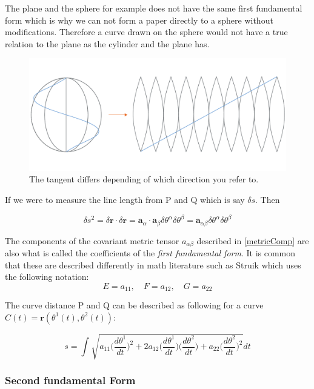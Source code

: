 The plane and the sphere for example does not have the same first fundamental form which is why we can not form a paper directly to a sphere without modifications. Therefore a curve drawn on the sphere would not have a true relation to the plane as the cylinder and the plane has.

\begin{figure}[H]
\centering
\includegraphics[width=0.9\linewidth ]{figure/Theory/unrollSurfMod.pdf}
\caption{The tangent differs depending of which direction you refer to. }
\end{figure}


If we were to measure the line length from P and Q which is say $\delta s$. Then 

\begin{equation}
\delta s^2 = \delta \textbf{r} \cdot \delta \textbf{r} =  \textbf{a}_\alpha \cdot \textbf{a}_\beta \delta\theta^\alpha \delta\theta^\beta =  \textbf{a}_{\alpha\beta} \delta\theta^\alpha \delta\theta^\beta 
\end{equation}

The components of the covariant metric tensor $a_{\alpha \beta}$ described in \ref{metricComp} are also what is called the coefficients of the \textit{first fundamental form}.
It is common that these are described differently in math literature such as Struik which uses the following notation:
$$ E= a_{11} ,\quad  F = a_{12},\quad
 G = a_{22}$$

The curve distance P and Q can be described as following for a curve $ \textit{C}(t) = \textbf{r}(\theta^1(t),\theta^2(t))$:

$$s = \int { \sqrt { a_{11} \Big(\frac{d\theta^1 }{dt}\Big)^2+2a_{12}\Big(\frac{d\theta^1 }{dt}\Big)\Big(\frac{d\theta^2 }{dt}\Big)  +a_{22} \Big(\frac{d\theta^2 }{dt}\Big)^2 }  } dt$$



\subsubsection{Second fundamental Form}


